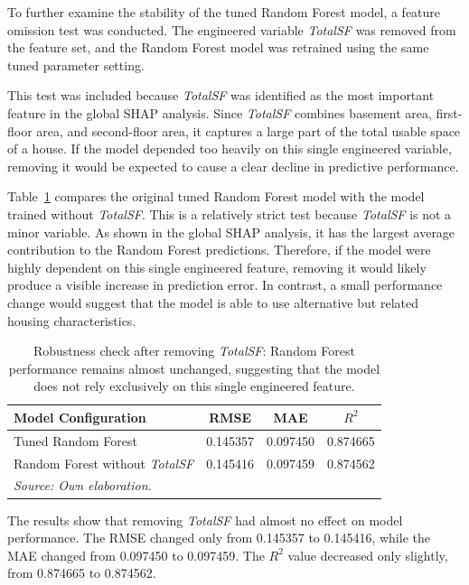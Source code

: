 \documentclass[12pt,a4paper,oneside,openany]{book}
\begin{document}
To further examine the stability of the tuned Random Forest model, a feature omission test was conducted. The engineered variable \textit{TotalSF} was removed from the feature set, and the Random Forest model was retrained using the same tuned parameter setting.

This test was included because \textit{TotalSF} was identified as the most important feature in the global SHAP analysis. Since \textit{TotalSF} combines basement area, first-floor area, and second-floor area, it captures a large part of the total usable space of a house. If the model depended too heavily on this single engineered variable, removing it would be expected to cause a clear decline in predictive performance.

Table~\ref{tab:stability_results} compares the original tuned Random Forest model with the model trained without \textit{TotalSF}. This is a relatively strict test because \textit{TotalSF} is not a minor variable. As shown in the global SHAP analysis, it has the largest average contribution to the Random Forest predictions. Therefore, if the model were highly dependent on this single engineered feature, removing it would likely produce a visible increase in prediction error. In contrast, a small performance change would suggest that the model is able to use alternative but related housing characteristics.

\begin{table}[H]
\centering
\caption[Robustness check after removing TotalSF]
{Robustness check after removing \protect\textit{TotalSF}: Random Forest performance remains almost unchanged, suggesting that the model does not rely exclusively on this single engineered feature.}
\label{tab:stability_results}
\begin{tabular}{lccc}
\toprule
Model Configuration & RMSE & MAE & $R^2$ \\
\midrule
Tuned Random Forest & 0.145357 & 0.097450 & 0.874665 \\
Random Forest without \textit{TotalSF} & 0.145416 & 0.097459 & 0.874562 \\
\bottomrule
\textit{Source: Own elaboration.}
\end{tabular}
\end{table}

The results show that removing \textit{TotalSF} had almost no effect on model performance. The RMSE changed only from 0.145357 to 0.145416, while the MAE changed from 0.097450 to 0.097459. The $R^2$ value decreased only slightly, from 0.874665 to 0.874562.
\end{document}
